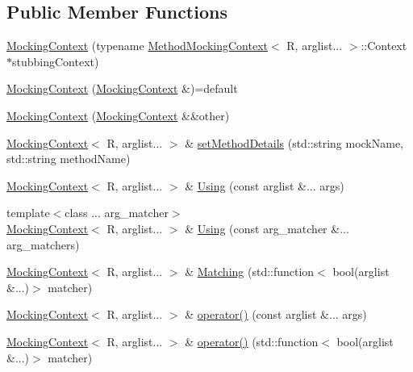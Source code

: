 \subsection*{Public Member Functions}
\begin{DoxyCompactItemize}
\item 
\mbox{\hyperlink{classfakeit_1_1MockingContext_a5700542bcb10d5ff297e389f9ea988e8}{Mocking\+Context}} (typename \mbox{\hyperlink{classfakeit_1_1MethodMockingContext}{Method\+Mocking\+Context}}$<$ R, arglist... $>$\+::Context $\ast$stubbing\+Context)
\item 
\mbox{\hyperlink{classfakeit_1_1MockingContext_aa4fec015b3088d8d98449f6a90525e0d}{Mocking\+Context}} (\mbox{\hyperlink{classfakeit_1_1MockingContext}{Mocking\+Context}} \&)=default
\item 
\mbox{\hyperlink{classfakeit_1_1MockingContext_a4611ccb2f40b25362c40316ec87c0da5}{Mocking\+Context}} (\mbox{\hyperlink{classfakeit_1_1MockingContext}{Mocking\+Context}} \&\&other)
\item 
\mbox{\hyperlink{classfakeit_1_1MockingContext}{Mocking\+Context}}$<$ R, arglist... $>$ \& \mbox{\hyperlink{classfakeit_1_1MockingContext_a07958a59915dcc84633818a9644e1921}{set\+Method\+Details}} (std\+::string mock\+Name, std\+::string method\+Name)
\item 
\mbox{\hyperlink{classfakeit_1_1MockingContext}{Mocking\+Context}}$<$ R, arglist... $>$ \& \mbox{\hyperlink{classfakeit_1_1MockingContext_ade706bb68e9ffb128fad353a3b15758b}{Using}} (const arglist \&... args)
\item 
{\footnotesize template$<$class ... arg\+\_\+matcher$>$ }\\\mbox{\hyperlink{classfakeit_1_1MockingContext}{Mocking\+Context}}$<$ R, arglist... $>$ \& \mbox{\hyperlink{classfakeit_1_1MockingContext_acb9bd9b011ac2ad88c8d08eebfa101ac}{Using}} (const arg\+\_\+matcher \&... arg\+\_\+matchers)
\item 
\mbox{\hyperlink{classfakeit_1_1MockingContext}{Mocking\+Context}}$<$ R, arglist... $>$ \& \mbox{\hyperlink{classfakeit_1_1MockingContext_a631dd9877017e082b2e1191b02f4c17a}{Matching}} (std\+::function$<$ bool(arglist \&...)$>$ matcher)
\item 
\mbox{\hyperlink{classfakeit_1_1MockingContext}{Mocking\+Context}}$<$ R, arglist... $>$ \& \mbox{\hyperlink{classfakeit_1_1MockingContext_a70a55886680449fa36e8f5869af93389}{operator()}} (const arglist \&... args)
\item 
\mbox{\hyperlink{classfakeit_1_1MockingContext}{Mocking\+Context}}$<$ R, arglist... $>$ \& \mbox{\hyperlink{classfakeit_1_1MockingContext_aff3a6b6107f5bc4e028e75bf9b55f313}{operator()}} (std\+::function$<$ bool(arglist \&...)$>$ matcher)

\end{DoxyCompactItemize}
